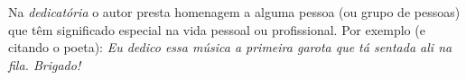 Na \emph{dedicatória} o autor presta homenagem a alguma pessoa (ou grupo de pessoas)
que têm significado especial na vida pessoal ou profissional. Por exemplo (e citando o poeta):
\emph{Eu dedico essa música a primeira garota que tá sentada ali na fila. Brigado!}